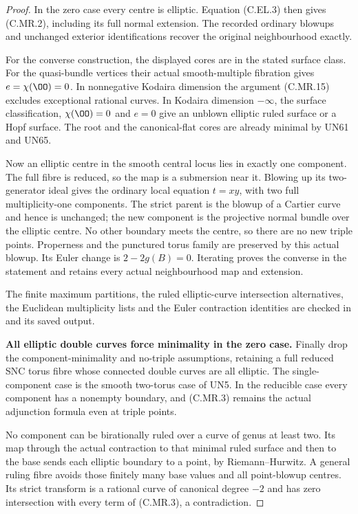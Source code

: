 \begin{proof}
In the zero case every
centre is elliptic.
Equation (C.EL.3) then
gives (C.MR.2), including
its full normal extension.
The recorded ordinary
blowups and unchanged
exterior identifications
recover the original
neighbourhood exactly.

For the converse construction,
the displayed cores are in
the stated surface class.
For the quasi-bundle vertices
their actual smooth-multiple
fibration gives $e=\chi(\OO)=0$.
In nonnegative Kodaira dimension
the argument (C.MR.15) excludes
exceptional rational curves.
In Kodaira dimension $-\infty$,
the surface classification,
$\chi(\OO)=0$ and $e=0$
give an unblown elliptic ruled
surface or a Hopf surface.
The root and the canonical-flat
cores are already minimal by
UN61 and UN65.

Now
an elliptic centre in the
smooth central locus lies
in exactly one component.
The full fibre is reduced,
so the map is a submersion
near it. Blowing up its
two-generator ideal gives
the ordinary local equation
$t=xy$, with two full
multiplicity-one components.
The strict parent is the
blowup of a Cartier curve
and hence is unchanged;
the new component is the
projective normal bundle
over the elliptic centre.
No other boundary meets the
centre, so there are no
new triple points.
Properness and the punctured
torus family are preserved
by this actual blowup.
Its Euler change is
$2-2g(B)=0$. Iterating
proves the converse in
the statement and retains
every actual neighbourhood
map and extension.

The finite maximum partitions,
the ruled elliptic-curve
intersection alternatives,
the Euclidean multiplicity
lists and the Euler
contraction identities are
checked in
and its saved output.

\par\medskip\noindent\textbf{All elliptic double curves force minimality in the zero case.}
Finally drop the component-minimality and no-triple
assumptions, retaining a full reduced SNC torus fibre
whose connected double curves are all elliptic.
The single-component case is the smooth two-torus
case of UN5. In the reducible case every component
has a nonempty boundary, and (C.MR.3) remains the
actual adjunction formula even at triple points.

No component can be birationally ruled over a
curve of genus at least two. Its map through
the actual contraction to that minimal ruled
surface and then to the base sends each
elliptic boundary to a point, by
Riemann--Hurwitz. A general ruling fibre
avoids those finitely many base values and
all point-blowup centres. Its strict
transform is a rational curve of
canonical degree $-2$ and has zero
intersection with every term of
(C.MR.3), a contradiction.


\end{proof}
